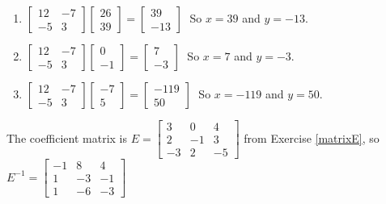 \documentclass{ximera}
\begin{document}
\begin{enumerate}
\setcounter{enumi}{\value{HW}}

\item $\left[ \begin{array}{rr} 12 & -7 \\ -5 & 3 \end{array} \right] \left[ \begin{array}{r} 26 \\ 39 \end{array} \right] = \left[ \begin{array}{r} 39 \\ -13 \end{array} \right] \;$ So $x = 39$ and $y = -13$.
\item $\left[ \begin{array}{rr} 12 & -7 \\ -5 & 3 \end{array} \right] \left[ \begin{array}{r} 0 \\ -1 \end{array} \right] = \left[ \begin{array}{r} 7 \\ -3 \end{array} \right] \;$ So $x = 7$ and $y = -3$.
\item $\left[ \begin{array}{rr} 12 & -7 \\ -5 & 3 \end{array} \right] \left[ \begin{array}{r} -7 \\ 5 \end{array} \right] = \left[ \begin{array}{r} -119 \\ 50 \end{array} \right] \;$ So $x = -119$ and $y = 50$.

\setcounter{HW}{\value{enumi}}
\end{enumerate}

The coefficient matrix is $E = \left[ \begin{array}{rrr} 3 & 0 & 4 \\ 2 & -1 & 3 \\ -3 & 2 & -5 \end{array} \right]$ from Exercise \ref{matrixE}, so $E^{-1} = \left[ \begin{array}{rrr} -1 & 8 & 4 \\ 1 & -3 & -1 \\ 1 & -6 & -3 \end{array} \right]$ 
\end{document}
